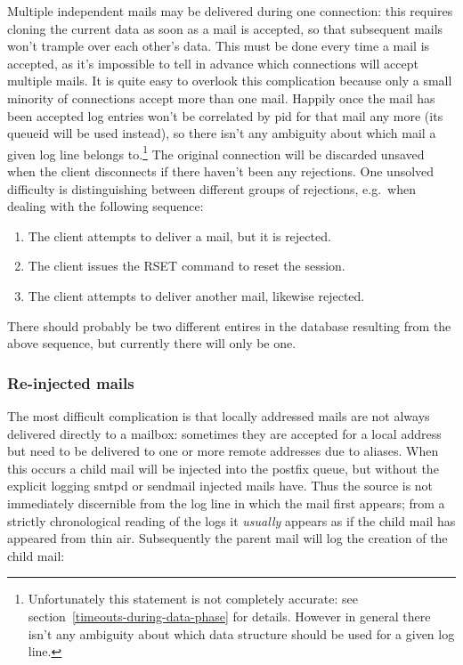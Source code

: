 \documentclass[a4paper,12pt,draft]{article}
\begin{document}
Multiple independent mails may be delivered during one connection: this
requires cloning the current data as soon as a mail is accepted, so that
subsequent mails won't trample over each other's data.  This must be done
every time a mail is accepted, as it's impossible to tell in advance which
connections will accept multiple mails.  It is quite easy to overlook this
complication because only a small minority of connections accept more than
one mail. Happily once the mail has been accepted log entries won't be
correlated by pid for that mail any more (its queueid will be used
instead), so there isn't any ambiguity about which mail a given log line
belongs to.\footnote{Unfortunately this statement is not completely
accurate: see section~\ref{timeouts-during-data-phase} for details.
However in general there isn't any ambiguity about which data structure
should be used for a given log line.}  The original connection will be
discarded unsaved when the client disconnects if there haven't been any
rejections.  One unsolved difficulty is
distinguishing between different groups of rejections, e.g.\ when dealing
with the following sequence:

\begin{enumerate}

    \item The client attempts to deliver a mail, but it is rejected.

    \item The client issues the RSET command to reset the session.

    \item The client attempts to deliver another mail, likewise rejected.

\end{enumerate}

There should probably be two different entires in the database resulting
from the above sequence, but currently there will only be one.



\subsubsection{Re-injected mails}

The most difficult complication is that locally addressed mails are not
always delivered directly to a mailbox: sometimes they are accepted for a
local address but need to be delivered to one or more remote addresses due
to aliases.  When this occurs a child mail will be injected into the
postfix queue, but without the explicit logging smtpd or sendmail injected
mails have.  Thus the source is not immediately discernible from the log
line in which the mail first appears; from a strictly chronological reading
of the logs it \textit{usually\/} appears as if the child mail has appeared
from thin air.  Subsequently the parent mail will log the creation of the
child mail:
\end{document}
